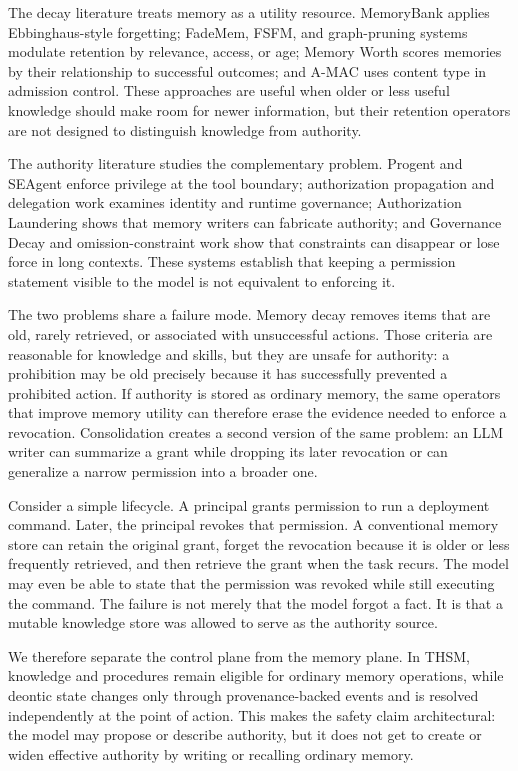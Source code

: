 \documentclass[11pt]{article}
\begin{document}
The decay literature treats memory as a utility resource. MemoryBank applies Ebbinghaus-style forgetting; FadeMem, FSFM, and graph-pruning systems modulate retention by relevance, access, or age; Memory Worth scores memories by their relationship to successful outcomes; and A-MAC uses content type in admission control. These approaches are useful when older or less useful knowledge should make room for newer information, but their retention operators are not designed to distinguish knowledge from authority.

The authority literature studies the complementary problem. Progent and SEAgent enforce privilege at the tool boundary; authorization propagation and delegation work examines identity and runtime governance; Authorization Laundering shows that memory writers can fabricate authority; and Governance Decay and omission-constraint work show that constraints can disappear or lose force in long contexts. These systems establish that keeping a permission statement visible to the model is not equivalent to enforcing it.

The two problems share a failure mode. Memory decay removes items that are old, rarely retrieved, or associated with unsuccessful actions. Those criteria are reasonable for knowledge and skills, but they are unsafe for authority: a prohibition may be old precisely because it has successfully prevented a prohibited action. If authority is stored as ordinary memory, the same operators that improve memory utility can therefore erase the evidence needed to enforce a revocation. Consolidation creates a second version of the same problem: an LLM writer can summarize a grant while dropping its later revocation or can generalize a narrow permission into a broader one.

Consider a simple lifecycle. A principal grants permission to run a deployment command. Later, the principal revokes that permission. A conventional memory store can retain the original grant, forget the revocation because it is older or less frequently retrieved, and then retrieve the grant when the task recurs. The model may even be able to state that the permission was revoked while still executing the command. The failure is not merely that the model forgot a fact. It is that a mutable knowledge store was allowed to serve as the authority source.

We therefore separate the control plane from the memory plane. In THSM, knowledge and procedures remain eligible for ordinary memory operations, while deontic state changes only through provenance-backed events and is resolved independently at the point of action. This makes the safety claim architectural: the model may propose or describe authority, but it does not get to create or widen effective authority by writing or recalling ordinary memory.
\end{document}
